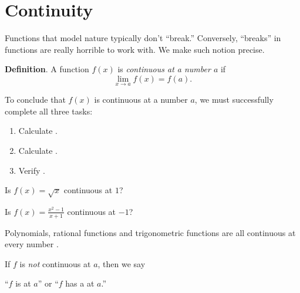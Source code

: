 \documentclass[../main.tex]{subfiles}
\begin{document}
 \section{Continuity}

  Functions that model nature typically don't ``break.'' Conversely, ``breaks'' in functions are really horrible to work with. We make such notion precise. 

  \begin{mdframed}[style=withref]
    \textbf{Definition}. A function \(f(x)\) is \emph{continuous at a number \(a\)} if 
    \[
      {\lim_{x \to a} f(x) = f(a).}
    \]
  \end{mdframed}

  To conclude that \(f(x)\) is continuous at a number \(a\), we must successfully complete all three tasks:
  \begin{enumerate}[label=(C\arabic*), itemsep={2ex}]
    \item Calculate \underline{\hspace{3in}}.
    \item Calculate \underline{\hspace{3in}}.
    \item Verify \underline{\hspace{3.23in}}.
  \end{enumerate}

  \begin{example}
    Is \(f(x) = \sqrt{x}\) continuous at \(1\)? 

  \end{example}

  \begin{example}
    Is \(f(x) = \frac{x^{2}-1}{x+1}\) continuous at \(-1\)? 

  \end{example}

  \begin{mdframed}[style=withref-compact]
    Polynomials, rational functions and trigonometric functions are all continuous at every number \underline{\hspace{2in}}. 
    
  \end{mdframed}
  \clearpage


  If \(f\) is \emph{not} continuous at \(a\), then we say
  \begin{center}
    ``\(f\) is  at \(a\)'' \quad or \quad ``\(f\) has a  at \(a\).''
  \end{center}
\end{document}
